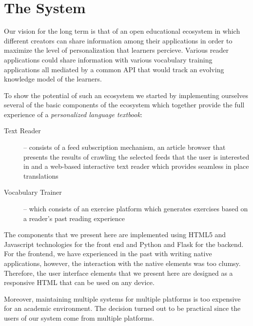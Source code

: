 
\newpage
\section{The System}
\label{sec:system}

Our vision for the long term is that of an open educational ecosystem in which different creators can share information among their applications in order to maximize the level of personalization that learners percieve. Various reader applications could share information with various vocabulary training applications all mediated by a common API that would track an evolving knowledge model of the learners\cite{Lungu16}.


To show the potential of such an ecosystem we started by implementing ourselves several of the basic components of the ecosystem which together provide the full experience of a {\em personalized language textbook}: 

\begin{description}

  \item [Text Reader] -- consists of a feed subscription mechanism, an article browser that presents the results of crawling the selected feeds that the user is interested in and a web-based interactive text reader which provides seamless in place translations
  
  \item [Vocabulary Trainer] -- which consists of an exercise platform which generates exercises based on a reader's past reading experience

\end{description}


The components that we present here are implemented using HTML5 and Javascript technologies for the front end and Python and Flask for the backend. For the frontend, we have experienced in the past with writing native applications, however, the interaction with the native elements was too clumsy. Therefore, the user interface elements that we present here are designed as a responsive HTML that can be used on any device. 

Moreover, maintaining multiple systems for multiple platforms is too expensive for an academic environment. The decision turned out to be practical since the users of our system come from multiple platforms.


